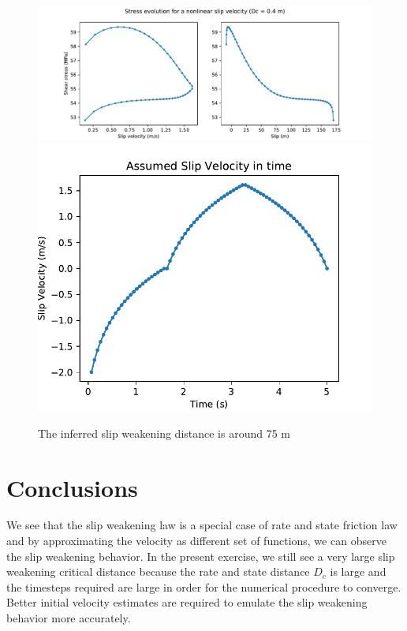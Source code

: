 \documentclass[11pt]{article}
\begin{document}
\begin{figure}[!htb]
    \centering
    \includegraphics[scale=0.6]{fig3.pdf}
    \includegraphics[scale=0.5]{fig3_v.pdf}
    \caption{The inferred slip weakening distance is around 75 m}
\end{figure}

\clearpage
\section*{Conclusions}
We see that the slip weakening law is a special case of rate and state friction law and by approximating the velocity as different set of functions, we can observe the slip weakening behavior. In the present exercise, we still see a very large slip weakening critical distance because the rate and state distance $D_c$ is large and the timesteps required are large in order for the numerical procedure to converge. Better initial velocity estimates are required to emulate the slip weakening behavior more accurately. 
\end{document}
